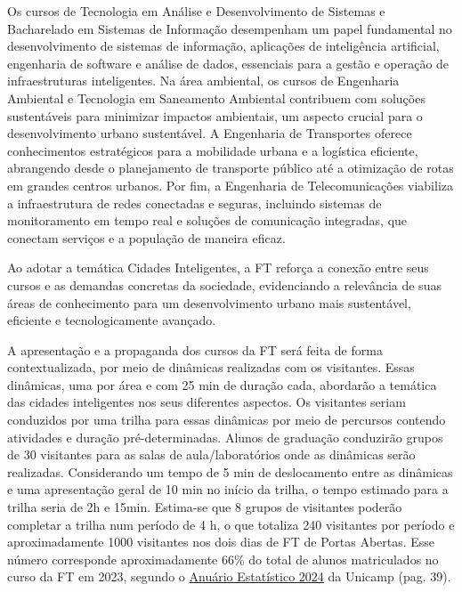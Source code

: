\documentclass[
  letterpaper,
  DIV=11,
  numbers=noendperiod]{scrreprt}
\begin{document}
Os cursos de Tecnologia em Análise e Desenvolvimento de Sistemas e
Bacharelado em Sistemas de Informação desempenham um papel fundamental
no desenvolvimento de sistemas de informação, aplicações de inteligência
artificial, engenharia de software e análise de dados, essenciais para a
gestão e operação de infraestruturas inteligentes. Na área ambiental, os
cursos de Engenharia Ambiental e Tecnologia em Saneamento Ambiental
contribuem com soluções sustentáveis para minimizar impactos ambientais,
um aspecto crucial para o desenvolvimento urbano sustentável. A
Engenharia de Transportes oferece conhecimentos estratégicos para a
mobilidade urbana e a logística eficiente, abrangendo desde o
planejamento de transporte público até a otimização de rotas em grandes
centros urbanos. Por fim, a Engenharia de Telecomunicações viabiliza a
infraestrutura de redes conectadas e seguras, incluindo sistemas de
monitoramento em tempo real e soluções de comunicação integradas, que
conectam serviços e a população de maneira eficaz.

Ao adotar a temática Cidades Inteligentes, a FT reforça a conexão entre
seus cursos e as demandas concretas da sociedade, evidenciando a
relevância de suas áreas de conhecimento para um desenvolvimento urbano
mais sustentável, eficiente e tecnologicamente avançado.

A apresentação e a propaganda dos cursos da FT será feita de forma
contextualizada, por meio de dinâmicas realizadas com os visitantes.
Essas dinâmicas, uma por área e com 25 min de duração cada, abordarão a
temática das cidades inteligentes nos seus diferentes aspectos. Os
visitantes seriam conduzidos por uma trilha para essas dinâmicas por
meio de percursos contendo atividades e duração pré-determinadas. Alunos
de graduação conduzirão grupos de 30 visitantes para as salas de
aula/laboratórios onde as dinâmicas serão realizadas. Considerando um
tempo de 5 min de deslocamento entre as dinâmicas e uma apresentação
geral de 10 min no início da trilha, o tempo estimado para a trilha
seria de 2h e 15min. Estima-se que 8 grupos de visitantes poderão
completar a trilha num período de 4 h, o que totaliza 240 visitantes por
período e aproximadamente 1000 visitantes nos dois dias de FT de Portas
Abertas. Esse número corresponde aproximadamente 66\% do total de alunos
matriculados no curso da FT em 2023, segundo o
\href{https://aeplan.unicamp.br/wp-content/uploads/sites/5/2024/05/anuario-2024.pdf}{Anuário
Estatístico 2024} da Unicamp (pag. 39).
\end{document}
